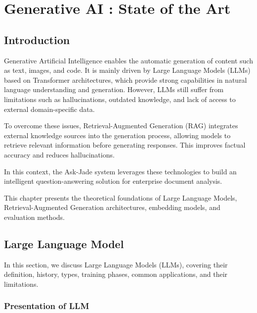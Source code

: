 \chapter{Generative AI : State of the Art}


\section{Introduction}


Generative Artificial Intelligence enables the automatic generation of content such as text, images, and code. It is mainly driven by Large Language Models (LLMs) based on Transformer architectures, which provide strong capabilities in natural language understanding and generation. However, LLMs still suffer from limitations such as hallucinations, outdated knowledge, and lack of access to external domain-specific data.

To overcome these issues, Retrieval-Augmented Generation (RAG) integrates external knowledge sources into the generation process, allowing models to retrieve relevant information before generating responses. This improves factual accuracy and reduces hallucinations.

In this context, the Ask-Jade system leverages these technologies to build an intelligent question-answering solution for enterprise document analysis.

This chapter presents the theoretical foundations of Large Language Models, Retrieval-Augmented Generation architectures, embedding models, and evaluation methods.

\section{Large Language Model}

In this section, we discuss Large Language Models (LLMs), covering their
definition, history, types, training phases, common applications,
and their limitations.

\subsection{Presentation of LLM}

